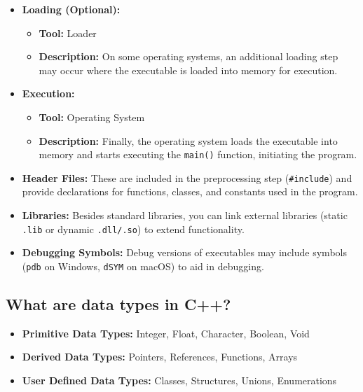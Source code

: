\begin{itemize}
\begin{itemize}
    \end{itemize}
    \item \textbf{Loading (Optional):}
    \begin{itemize}
        \item \textbf{Tool:} Loader
        \item \textbf{Description:} On some operating systems, an additional loading step may occur where the executable is loaded into memory for execution.
    \end{itemize}
    \item \textbf{Execution:}
    \begin{itemize}
        \item \textbf{Tool:} Operating System
        \item \textbf{Description:} Finally, the operating system loads the executable into memory and starts executing the \texttt{main()} function, initiating the program.
    \end{itemize}
\end{itemize}
\begin{tcolorbox}[arc=5pt, boxrule=2pt, title=Notes]
    \begin{itemize}
    \item \textbf{Header Files:} These are included in the preprocessing step (\texttt{\#include}) and provide declarations for functions, classes, and constants used in the program.
    \item \textbf{Libraries:} Besides standard libraries, you can link external libraries (static \texttt{.lib} or dynamic \texttt{.dll/.so}) to extend functionality.
    \item \textbf{Debugging Symbols:} Debug versions of executables may include symbols (\texttt{pdb} on Windows, \texttt{dSYM} on macOS) to aid in debugging.
    \end{itemize}
\end{tcolorbox}

\subsection{What are data types in C++?}
\begin{itemize}
    \item \textbf{Primitive Data Types:} Integer, Float, Character, Boolean, Void
    \item \textbf{Derived Data Types:} Pointers, References, Functions, Arrays
    \item \textbf{User Defined Data Types:} Classes, Structures, Unions, Enumerations
\end{itemize}

